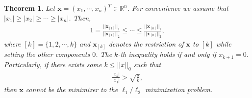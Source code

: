\documentclass[11pt]{article}
\numberwithin{equation}{section}
\theoremstyle{plain}
\newtheorem{Th}{Theorem}[section]
\theoremstyle{definition}
\def\R{{\mathbb R}}
\def\R{{\mathbb R}}
\def\x{{\mathbf x}}
\begin{document}
\begin{Th}\label{L2}
Let $\x=(x_1, \cdots, x_n)^T\in\R^n$. For convenience we assume that $|x_1|\geq |x_2|\geq\cdots\geq |x_n|$. Then,
\begin{align*}
1=\frac{||\x_{[1]}||_1}{||\x_{[1]}||_2}\leq\cdots\leq\frac{||\x_{[n]}||_1}{||\x_{[n]}||_2}, 
\end{align*}
where $[k]=\{1,2,\cdots, k\}$ and $\x_{[k]}$ denotes the restriction of $\x$ to $[k]$ while setting the other components $0$. The $k$-th inequality holds if and only if $x_{k+1}=0$. Particularly, if there exists some $k\leq ||x||_0$ such that 
\begin{align}
\frac{|x_k|}{|x_1|}>\sqrt{\frac{s}{k}},\label{intuition-comp}
\end{align}
then $\x$ cannot be the minimizer to the $\ell_1/\ell_2$ minimization problem.   
\end{Th}
\end{document}
